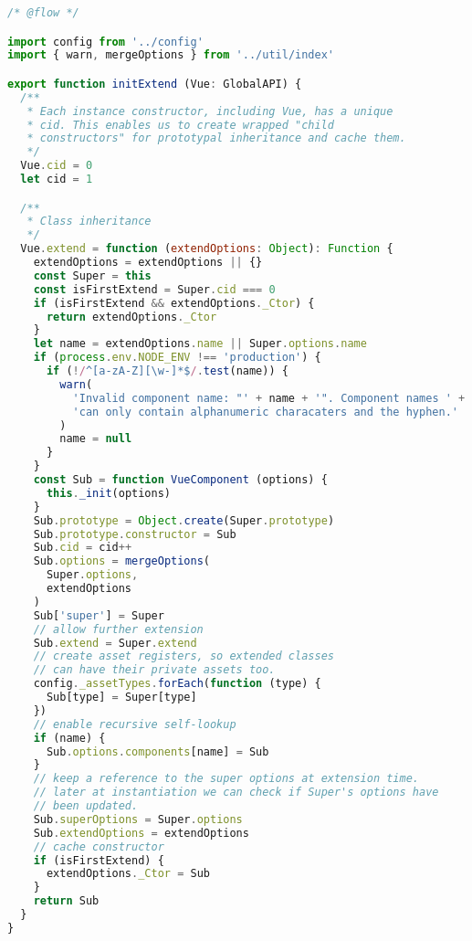 \begin{lstlisting}[language=JavaScript]
/* @flow */

import config from '../config'
import { warn, mergeOptions } from '../util/index'

export function initExtend (Vue: GlobalAPI) {
  /**
   * Each instance constructor, including Vue, has a unique
   * cid. This enables us to create wrapped "child
   * constructors" for prototypal inheritance and cache them.
   */
  Vue.cid = 0
  let cid = 1

  /**
   * Class inheritance
   */
  Vue.extend = function (extendOptions: Object): Function {
    extendOptions = extendOptions || {}
    const Super = this
    const isFirstExtend = Super.cid === 0
    if (isFirstExtend && extendOptions._Ctor) {
      return extendOptions._Ctor
    }
    let name = extendOptions.name || Super.options.name
    if (process.env.NODE_ENV !== 'production') {
      if (!/^[a-zA-Z][\w-]*$/.test(name)) {
        warn(
          'Invalid component name: "' + name + '". Component names ' +
          'can only contain alphanumeric characaters and the hyphen.'
        )
        name = null
      }
    }
    const Sub = function VueComponent (options) {
      this._init(options)
    }
    Sub.prototype = Object.create(Super.prototype)
    Sub.prototype.constructor = Sub
    Sub.cid = cid++
    Sub.options = mergeOptions(
      Super.options,
      extendOptions
    )
    Sub['super'] = Super
    // allow further extension
    Sub.extend = Super.extend
    // create asset registers, so extended classes
    // can have their private assets too.
    config._assetTypes.forEach(function (type) {
      Sub[type] = Super[type]
    })
    // enable recursive self-lookup
    if (name) {
      Sub.options.components[name] = Sub
    }
    // keep a reference to the super options at extension time.
    // later at instantiation we can check if Super's options have
    // been updated.
    Sub.superOptions = Super.options
    Sub.extendOptions = extendOptions
    // cache constructor
    if (isFirstExtend) {
      extendOptions._Ctor = Sub
    }
    return Sub
  }
}
\end{lstlisting}






\begin{lstlisting}[language=JavaScript]

\end{lstlisting}






